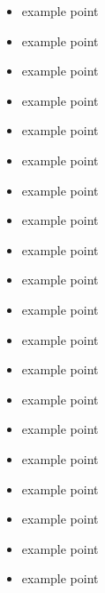 
{
  {\begin{itemize}
    \item example point
    \item example point
    \item example point
    \item example point
    \item example point
  \end{itemize}
  }
}

{
  {\begin{itemize}
    \item example point
    \item example point
    \item example point
    \item example point
    \item example point
  \end{itemize}
  }
}

{
  {\begin{itemize}
    \item example point
    \item example point
    \item example point
    \item example point
    \item example point
  \end{itemize}
  }
}

{
  {\begin{itemize}
    \item example point
    \item example point
    \item example point
    \item example point
    \item example point
  \end{itemize}
  }
}
